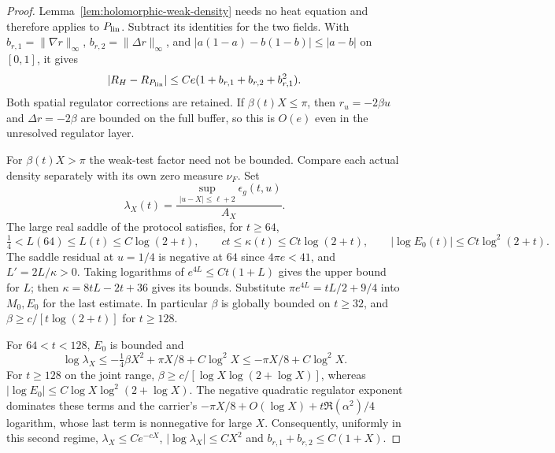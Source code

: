 \begin{proof}
Lemma~\ref{lem:holomorphic-weak-density} needs no heat equation and
therefore applies to $P_{\rm lin}$.  Subtract its identities for the
two fields.  With $b_{r,1}=\|\nabla r\|_\infty$,
$b_{r,2}=\|\Delta r\|_\infty$, and
$|a(1-a)-b(1-b)|\le|a-b|$ on $[0,1]$, it gives
\begin{equation}
 |R_H-R_{P_{\rm lin}}|
 \le Ce(1+b_{r,1}+b_{r,2}+b_{r,1}^2).
 \label{eq:linear-weak-transfer}
\end{equation}
Both spatial regulator corrections are retained.  If $\beta(t)X\le\pi$,
then $r_u=-2\beta u$ and $\Delta r=-2\beta$ are bounded on the full
buffer, so this is $O(e)$ even in the unresolved regulator layer.

For $\beta(t)X>\pi$ the weak-test factor need not be bounded.
Compare each actual density separately with its own zero measure
$\nu_F$.  Set
\begin{equation}
 \lambda_X(t)=\frac{\sup_{|u-X|\le\ell+2}\epsilon_g(t,u)}{A_X}.
 \label{eq:linear-regulator-ratio}
\end{equation}
The large real saddle of the protocol satisfies, for $t\ge64$,
\begin{equation}
 \tfrac14<L(64)\le L(t)\le C\log(2+t),\qquad
 ct\le\kappa(t)\le Ct\log(2+t),\qquad
 |\log E_0(t)|\le Ct\log^2(2+t).
 \label{eq:linear-regulator-growth}
\end{equation}
The saddle residual at $u=1/4$ is negative at $64$ since
$4\pi e<41$, and $L'=2L/\kappa>0$.  Taking logarithms of
$e^{4L}\le Ct(1+L)$ gives the upper bound for $L$; then
$\kappa=8tL-2t+36$ gives its bounds.  Substitute
$\pi e^{4L}=tL/2+9/4$ into $M_0,E_0$ for the last estimate.
In particular $\beta$ is globally bounded on $t\ge32$, and
$\beta\ge c/[t\log(2+t)]$ for $t\ge128$.

For $64<t<128$, $E_0$ is bounded and
\[
 \log\lambda_X\le-\tfrac14\beta X^2+\pi X/8+C\log^2X
 \le-\pi X/8+C\log^2X.
\]
For $t\ge128$ on the joint range,
$\beta\ge c/[\log X\log(2+\log X)]$, whereas
$|\log E_0|\le C\log X\log^2(2+\log X)$.
The negative quadratic regulator exponent dominates these terms and
the carrier's $-\pi X/8+O(\log X)+t\Re(\alpha^2)/4$ logarithm,
whose last term is nonnegative for large $X$.  Consequently, uniformly
in this second regime,
$\lambda_X\le Ce^{-cX}$, $|\log\lambda_X|\le CX^2$ and
$b_{r,1}+b_{r,2}\le C(1+X)$.


\end{proof}
